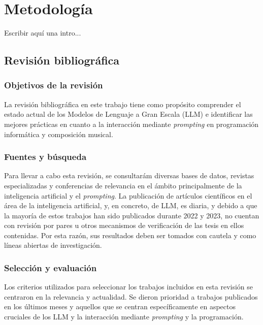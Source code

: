 \chapter{Metodología}


Escribir aquí una intro...

\section{Revisión bibliográfica}

\subsection{Objetivos de la revisión}
La revisión bibliográfica en este trabajo tiene como propósito comprender el estado actual de los Modelos de Lenguaje a Gran Escala (LLM) e identificar las mejores prácticas en cuanto a la interacción mediante \emph{prompting} en programación informática y composición musical.

\subsection{Fuentes y búsqueda}
Para llevar a cabo esta revisión, se consultarám diversas bases de datos, revistas especializadas y conferencias de relevancia en el ámbito principalmente de la inteligencia artificial y el \emph{prompting}. La publicación de artículos científicos en el área de la inteligencia artificial, y, en concreto, de LLM, es diaria, y debido a que la mayoría de estos trabajos han sido publicados durante 2022 y 2023, no cuentan con revisión por pares u otros mecanismos de verificación de las tesis en ellos contenidas. Por esta razón, sus resultados deben ser tomados con cautela y como líneas abiertas de investigación.

\subsection{Selección y evaluación}
Los criterios utilizados para seleccionar los trabajos incluidos en esta revisión se centraron en la relevancia y actualidad. Se dieron prioridad a trabajos publicados en los últimos meses y aquellos que se centran específicamente en aspectos cruciales de los LLM y la interacción mediante \emph{prompting} y la programación. 

